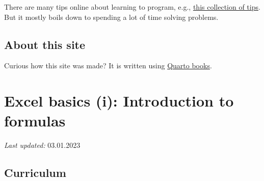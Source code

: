 \documentclass[
  letterpaper,
  DIV=11,
  numbers=noendperiod]{scrreprt}
\begin{document}
There are many tips online about learning to program, e.g.,
\href{https://www.codingdojo.com/blog/7-tips-learn-programming-faster}{this
collection of tips}. But it mostly boils down to spending a lot of time
solving problems.

\hypertarget{about-this-site}{%
\section*{About this site}\label{about-this-site}}


Curious how this site was made? It is written using
\href{https://quarto.org/docs/books}{Quarto books}.


\hypertarget{excel-basics-i-introduction-to-formulas}{%
\chapter{Excel basics (i): Introduction to
formulas}\label{excel-basics-i-introduction-to-formulas}}

\emph{Last updated:} 03.01.2023

\hypertarget{curriculum}{%
\section{Curriculum}\label{curriculum}}
\end{document}

